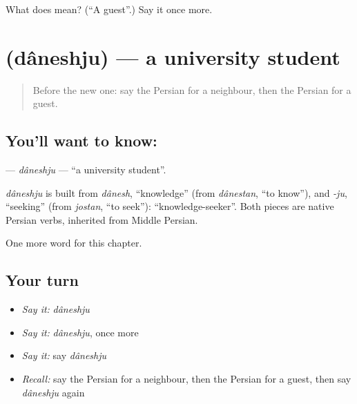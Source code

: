 \begin{tcolorbox}[breakable,colback=teal!4,colframe=teal!35!black,title={Before you move on}]
What does  mean? (\textquotedblleft{}A guest\textquotedblright{}.) Say it once more.
\end{tcolorbox}
\section[\texorpdfstring{\fa{دانشجو} (dâneshju)}{دانشجو (dâneshju)}]{ (dâneshju) — a university student}

\label{lesson:FA-C34-daneshju}



\begin{quote}
Before the new one: say the Persian for a neighbour, then the Persian for a guest.
\end{quote}

\subsection*{You'll want to know: }
\textbf{} — \emph{dâneshju} — \textquotedblleft{}a university student\textquotedblright{}.

\begin{cousinweb}
\emph{dâneshju} is built from \emph{dânesh}, \textquotedblleft{}knowledge\textquotedblright{} (from \emph{dânestan}, \textquotedblleft{}to know\textquotedblright{}), and \emph{-ju}, \textquotedblleft{}seeking\textquotedblright{} (from \emph{jostan}, \textquotedblleft{}to seek\textquotedblright{}): \textquotedblleft{}knowledge-seeker\textquotedblright{}. Both pieces are native Persian verbs, inherited from Middle Persian.
\end{cousinweb}

\begin{grammarlens}[title={What you've built}]
One more word for this chapter.
\end{grammarlens}

\subsection*{Your turn}
\begin{itemize}
\raggedright
  \item \emph{Say it:} \emph{dâneshju}
  \item \emph{Say it:} \emph{dâneshju}, once more
  \item \emph{Say it:} say \emph{dâneshju}
  \item \emph{Recall:} say the Persian for a neighbour, then the Persian for a guest, then say \emph{dâneshju} again
\end{itemize}

